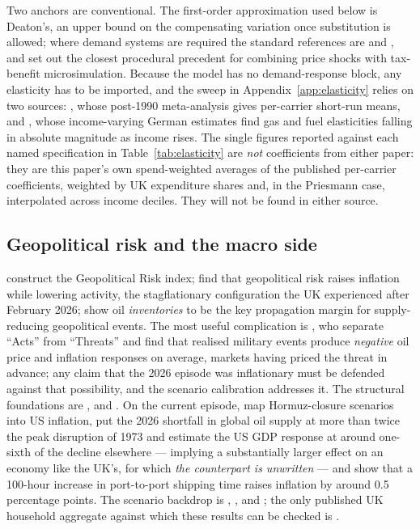 Two anchors are conventional. The first-order approximation used below is Deaton's, an upper bound on the compensating variation once substitution is allowed; where demand systems are required the standard references are \citet{deaton1980} and \citet{banks1997}, and \citet{odonoghue2023} set out the closest procedural precedent for combining price shocks with tax-benefit microsimulation. Because the model has no demand-response block, any elasticity has to be imported, and the sweep in Appendix~\ref{app:elasticity} relies on two sources: \citet{labandeira2017}, whose post-1990 meta-analysis gives per-carrier short-run means, and \citet{priesmann2025}, whose income-varying German estimates find gas and fuel elasticities falling in absolute magnitude as income rises. The single figures reported against each named specification in Table~\ref{tab:elasticity} are \emph{not} coefficients from either paper: they are this paper's own spend-weighted averages of the published per-carrier coefficients, weighted by UK expenditure shares and, in the Priesmann case, interpolated across income deciles. They will not be found in either source.

\subsection{Geopolitical risk and the macro side}

\citet{caldara2022} construct the Geopolitical Risk index; \citet{caldara2025} find that geopolitical risk raises inflation while lowering activity, the stagflationary configuration the UK experienced after February 2026; \citet{verduzco2026} show oil \emph{inventories} to be the key propagation margin for supply-reducing geopolitical events. The most useful complication is \citet{boe2025}, who separate ``Acts'' from ``Threats'' and find that realised military events produce \emph{negative} oil price and inflation responses on average, markets having priced the threat in advance; any claim that the 2026 episode was inflationary must be defended against that possibility, and the scenario calibration addresses it. The structural foundations are \citet{hamilton1983}, \citet{kilian2009} and \citet{baumeister2019}. On the current episode, \citet{dallasfed2026} map Hormuz-closure scenarios into US inflation, \citet{dallasfed2026b} put the 2026 shortfall in global oil supply at more than twice the peak disruption of 1973 and estimate the US GDP response at around one-sixth of the decline elsewhere --- implying a substantially larger effect on an economy like the UK's, for which \emph{the counterpart is unwritten} --- and \citet{imf2026ports} show that a 100-hour increase in port-to-port shipping time raises inflation by around 0.5 percentage points. The scenario backdrop is \citet{weo2026}, \citet{worldbank2026}, \citet{niesr2026spring} and \citet{niesr2026summer}; the only published UK household aggregate against which these results can be checked is \citet{rf2026outlook}.

